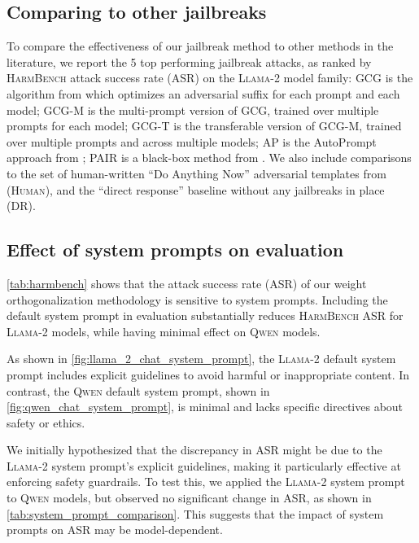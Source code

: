 \documentclass{article}
\begin{document}
\subsection{Comparing to other jailbreaks}
\label{appendix_other_jailbreaks}

To compare the effectiveness of our jailbreak method to other methods in the literature, we report the 5 top performing jailbreak attacks, as ranked by \textsc{HarmBench} attack success rate (ASR) on the \textsc{Llama-2} model family: \textsc{GCG} is the algorithm from \citet{zou2023universal} which optimizes an adversarial suffix for each prompt and each model;
\textsc{GCG-M} is the multi-prompt version of \textsc{GCG}, trained over multiple prompts for each model;
\textsc{GCG-T} is the transferable version of \textsc{GCG-M}, trained over multiple prompts and across multiple models;
\textsc{AP} is the AutoPrompt approach from \citet{shin2020autoprompt};
\textsc{PAIR} is a black-box method from \citet{chao2023jailbreaking}.
We also include comparisons to the set of human-written 
``Do Anything Now'' adversarial templates from \citet{shen2023anything} (\textsc{Human}), and the ``direct response'' baseline without any jailbreaks in place (\textsc{DR}).

\subsection{Effect of system prompts on evaluation}
\label{appendix_system_prompts}

\autoref{tab:harmbench} shows that the attack success rate (ASR) of our weight orthogonalization methodology is sensitive to system prompts.
Including the default system prompt in evaluation substantially reduces \textsc{HarmBench} ASR for \textsc{Llama-2} models, while having minimal effect on \textsc{Qwen} models.

As shown in \autoref{fig:llama_2_chat_system_prompt}, the \textsc{Llama-2} default system prompt includes explicit guidelines to avoid harmful or inappropriate content.
In contrast, the \textsc{Qwen} default system prompt, shown in \autoref{fig:qwen_chat_system_prompt}, is minimal and lacks specific directives about safety or ethics.

We initially hypothesized that the discrepancy in ASR might be due to the \textsc{Llama-2} system prompt's explicit guidelines, making it particularly effective at enforcing safety guardrails.
To test this, we applied the \textsc{Llama-2} system prompt to \textsc{Qwen} models, but observed no significant change in ASR, as shown in \autoref{tab:system_prompt_comparison}. 
This suggests that the impact of system prompts on ASR may be model-dependent.
\end{document}
